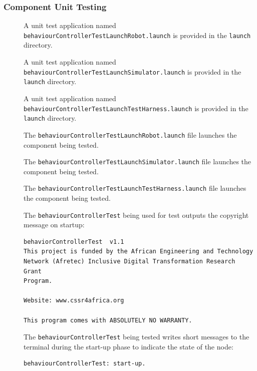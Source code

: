 \documentclass{CSSRforAfrica}
\newcommand{\checkboxChecked}{\fbox{\ding{51}}} %
\newcommand{\checkboxDashed}{\fbox{--}}         %
\begin{document}
\subsubsection{Component Unit Testing}
\label{subsubsection:behaviour_controller_test_unit_testing}


\begin{description}
\item[\checkboxChecked] A unit test application named {\small \verb+behaviourControllerTestLaunchRobot.launch+} is provided in the {\small \verb+launch+} directory. 

\item[\checkboxDashed] A unit test application named {\small \verb+behaviourControllerTestLaunchSimulator.launch+} is provided in the {\small \verb+launch+} directory. 

\item[\checkboxChecked] A unit test application named {\small \verb+behaviourControllerTestLaunchTestHarness.launch+} is provided in the {\small \verb+launch+} directory. 

\item[\checkboxChecked] The {\small \verb+behaviourControllerTestLaunchRobot.launch+} file  launches the component being tested.

\item[\checkboxDashed] The {\small \verb+behaviourControllerTestLaunchSimulator.launch+} file  launches the component being tested.

\item[\checkboxChecked] The {\small \verb+behaviourControllerTestLaunchTestHarness.launch+} file  launches the component being tested.

\item[\checkboxChecked]  The {\small \verb+behaviourControllerTest+} being used for test outputs the copyright message on startup:
\begin{verbatim}
behaviorControllerTest	v1.1
This project is funded by the African Engineering and Technology
Network (Afretec) Inclusive Digital Transformation Research Grant
Program.

Website: www.cssr4africa.org

This program comes with ABSOLUTELY NO WARRANTY.
\end{verbatim}

\item[\checkboxChecked]  The {\small \verb+behaviourControllerTest+} being tested writes short messages to the terminal during the start-up phase to
 indicate the state of the node:
\begin{verbatim}
behaviourControllerTest: start-up.
\end{verbatim}


\end{description}
\end{document}
